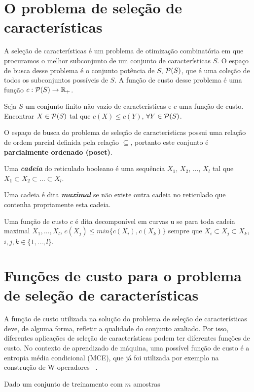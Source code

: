 
\section{O problema de seleção de características}
A seleção de características é um problema de otimização combinatória 
em que procuramos o melhor subconjunto de um conjunto de características
$S$. O espaço de busca desse problema é o conjunto potência de $S$, 
$\mathcal{P} (S)$, que é uma coleção de todos os subconjuntos possíveis de
 $S$. A função de custo desse problema é uma função $c : \mathcal{P} (S) 
\to \mathbb{R}_{+}$.

\begin{mydefinition} Seja $S$
um conjunto finito não vazio de características e $c$ uma função de 
custo. Encontrar $X \in \mathcal{P} (S)$ tal que $c (X) \leq c (Y)$,
$\forall Y \in \mathcal{P} (S)$.
\end{mydefinition}

O espaço de busca do problema de seleção de características possui uma
relação de ordem parcial definida pela relação $\subseteq$, portanto
este conjunto é {\bf parcialmente ordenado (poset)}.

\begin{mydefinition}
Uma {\bf \em cadeia} do reticulado booleano é uma sequência $X_1$, 
$X_2$, ..., $X_l$ tal que $X_1 \subset X_2 \subset \dots \subset X_l$.
\end{mydefinition}

\begin{mydefinition}
Uma cadeia é dita {\bf \em maximal} se não existe outra cadeia no 
reticulado que contenha propriamente esta cadeia.
\end{mydefinition}

\begin{mydefinition}
Uma função de custo $c$ é dita decomponível em curvas u se para toda 
cadeia maximal $X_1, ..., X_l$, $c(X_j) \leq min \{c (X_i),
c (X_k)\}$ sempre que $X_i \subset X_j \subset X_k$, $i, j, k \in 
\{1, ..., l\}$.
\end{mydefinition}

\section{Funções de custo para o problema de seleção de características}
A função de custo utilizada na solução do problema de seleção de 
características deve, de alguma forma, refletir a qualidade do conjunto 
avaliado. Por isso, diferentes aplicações de seleção de características
podem ter diferentes funções de custo. No contexto de aprendizado de 
máquina, uma possível função de custo é a entropia média condicional
(MCE), que já foi utilizada por exemplo na construção de W-operadores
~\cite{MJCJB06}.

\begin{mydefinition}
Dado um conjunto de treinamento com $m$ amostras 

\end{mydefinition}
